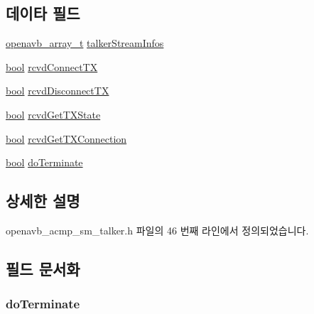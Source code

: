 \subsection*{데이타 필드}
\begin{DoxyCompactItemize}
\item 
\hyperlink{openavb__array_8h_a43e0de981c90a3d7c9ddeb67fbf2a54e}{openavb\+\_\+array\+\_\+t} \hyperlink{structopenavb__acmp__sm__talker__vars__t_a58e5ab953dfa4b58e1607e8cad895f76}{talker\+Stream\+Infos}
\item 
\hyperlink{avb__gptp_8h_af6a258d8f3ee5206d682d799316314b1}{bool} \hyperlink{structopenavb__acmp__sm__talker__vars__t_aa7943739706400f42f700e7607fe082d}{rcvd\+Connect\+TX}
\item 
\hyperlink{avb__gptp_8h_af6a258d8f3ee5206d682d799316314b1}{bool} \hyperlink{structopenavb__acmp__sm__talker__vars__t_a8bfb6db95ff172019dd1f80948e00d1e}{rcvd\+Disconnect\+TX}
\item 
\hyperlink{avb__gptp_8h_af6a258d8f3ee5206d682d799316314b1}{bool} \hyperlink{structopenavb__acmp__sm__talker__vars__t_a259b97054b2c200011009c8b1d1a99be}{rcvd\+Get\+T\+X\+State}
\item 
\hyperlink{avb__gptp_8h_af6a258d8f3ee5206d682d799316314b1}{bool} \hyperlink{structopenavb__acmp__sm__talker__vars__t_ae17125b7b49778d758b24e2d1a05e234}{rcvd\+Get\+T\+X\+Connection}
\item 
\hyperlink{avb__gptp_8h_af6a258d8f3ee5206d682d799316314b1}{bool} \hyperlink{structopenavb__acmp__sm__talker__vars__t_a5fc548cdb095393450f28eab966a626f}{do\+Terminate}
\end{DoxyCompactItemize}


\subsection{상세한 설명}


openavb\+\_\+acmp\+\_\+sm\+\_\+talker.\+h 파일의 46 번째 라인에서 정의되었습니다.



\subsection{필드 문서화}
\subsubsection[{\texorpdfstring{do\+Terminate}{doTerminate}}]{ do\+Terminate}\hypertarget{structopenavb__acmp__sm__talker__vars__t_a5fc548cdb095393450f28eab966a626f}{}\label{structopenavb__acmp__sm__talker__vars__t_a5fc548cdb095393450f28eab966a626f}


